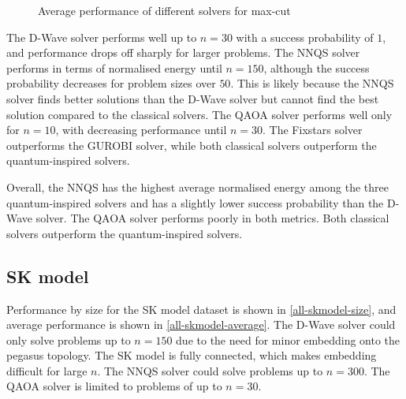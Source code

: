 \begin{figure}[!htb]
    \centering
    \hspace{30pt}
    \caption{Average performance of different solvers for max-cut}
    \label{all-maxcut-average}
\end{figure}

The D-Wave solver performs well up to $n=30$ with a success probability of $1$, and performance drops off sharply for larger problems. The NNQS solver performs in terms of normalised energy until $n=150$, although the success probability decreases for problem sizes over $50$. This is likely because the NNQS solver finds better solutions than the D-Wave solver but cannot find the best solution compared to the classical solvers. The QAOA solver performs well only for $n=10$, with decreasing performance until $n=30$. The Fixstars solver outperforms the GUROBI solver, while both classical solvers outperform the quantum-inspired solvers.

Overall, the NNQS has the highest average normalised energy among the three quantum-inspired solvers and has a slightly lower success probability than the D-Wave solver. The QAOA solver performs poorly in both metrics. Both classical solvers outperform the quantum-inspired solvers.

\subsection{SK model}
Performance by size for the SK model dataset is shown in \autoref{all-skmodel-size}, and average performance is shown in \autoref{all-skmodel-average}. The D-Wave solver could only solve problems up to $n=150$ due to the need for minor embedding onto the pegasus topology. The SK model is fully connected, which makes embedding difficult for large $n$. The NNQS solver could solve problems up to $n=300$. The QAOA solver is limited to problems of up to $n=30$.

